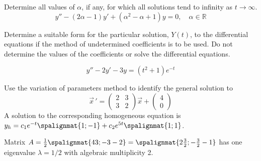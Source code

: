 \documentclass[12pt]{exam}
\begin{document}
    


\newpage \InitialsRight

\begin{questions}
    
    \question[4] Determine all values of $\alpha$, if any, for which all solutions tend to infinity as $t\to\infty$. $$y'' - (2\alpha - 1) y' + (\alpha^2-\alpha+1) y = 0, \quad \alpha \in \mathbb R$$ \vspace{7cm}  %
    
    
    

    \question[3]  Determine a suitable form for the particular solution, $Y(t)$, to the differential equations if the method of undetermined coefficients is to be used. Do not determine the values of the coefficients or solve the differential equations. 

    $$y'' - 2y' - 3y = (t^2 + 1)e^{-t}$$



    \newpage \InitialsLeft
    \question[8] Use the variation of parameters method to identify the general solution to \[\vec{x} \, ' = \left( \begin{array}{rr} 2 & 3 \\ 3 & 2 \end{array} \right) \vec{x}  + \left( \begin{array}{r}  4\\ 0\end{array} \right)  \]
    A solution to the corresponding homogeneous equation is $y_h = c_1e^{-t}\spalignmat{1;-1}+c_2e^{5t}\spalignmat{1;1}$.
    \newpage \InitialsRight
    \Scratch 
        
    \newpage \InitialsLeft
    \question[10] 
    Matrix $A = \frac 12 \spalignmat{4 3;-3 -2} = \spalignmat{2 \frac32;-\frac32 -1}$ has one eigenvalue $\lambda = 1/2$ with algebraic multiplicity 2. %

\end{questions}
\end{document}
